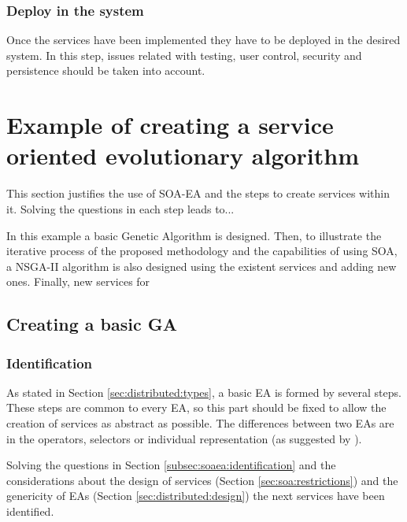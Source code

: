 \subsubsection{Deploy in the system} 
Once the services have been implemented they have to be deployed in the desired system. In this step, issues related with testing, user control, security and persistence should be taken into account.









\section{Example of creating a service oriented evolutionary algorithm}

This section justifies the use of SOA-EA and the steps to create services within it. Solving the questions in each step leads to... 

In this example a basic Genetic Algorithm is designed. Then, to illustrate the iterative process of the proposed methodology and the capabilities of using SOA, a NSGA-II algorithm is also designed using the existent services and adding new ones. Finally, new services for 

\subsection{Creating a basic GA}
\label{sec:soaea:creating}
\subsubsection{Identification}
As  stated in Section \ref{sec:distributed:types}, a basic EA is formed by several steps. These steps are common to every EA, so this part should be fixed  to allow the creation of services as abstract as possible. The differences between two EAs are in the operators, selectors or individual representation (as suggested by  \cite{ParameterTuningEiben2011}).

Solving the questions in Section \ref{subsec:soaea:identification} and the considerations about the design of services (Section \ref{sec:soa:restrictions}) and the genericity of EAs (Section \ref{sec:distributed:design}) the next services have been identified.

